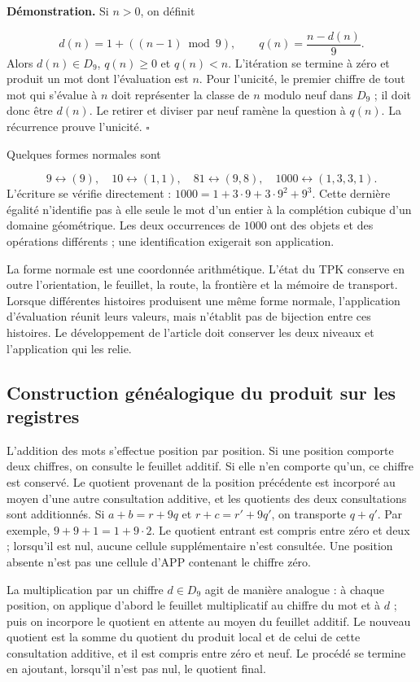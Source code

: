 \textbf{Démonstration.} Si $n>0$, on définit

\[
d(n)=1+((n-1)\bmod9),\qquad q(n)=\frac{n-d(n)}9.
\]
Alors $d(n)\in D_9$, $q(n)\ge0$ et $q(n)<n$. L’itération se termine à zéro et produit un mot dont l’évaluation est $n$. Pour l’unicité, le premier chiffre de tout mot qui s’évalue à $n$ doit représenter la classe de $n$ modulo neuf dans $D_9$ ; il doit donc être $d(n)$. Le retirer et diviser par neuf ramène la question à $q(n)$. La récurrence prouve l’unicité. \hfill\(\square\)

Quelques formes normales sont

\[
9\leftrightarrow(9),\quad
10\leftrightarrow(1,1),\quad
81\leftrightarrow(9,8),\quad
1000\leftrightarrow(1,3,3,1).
\]
L'écriture se vérifie directement : $1000=1+3\cdot9+3\cdot9^2+9^3$. Cette dernière égalité n'identifie pas à elle seule le mot d'un entier à la complétion cubique d'un domaine géométrique. Les deux occurrences de $1000$ ont des objets et des opérations différents ; une identification exigerait son application.

La forme normale est une coordonnée arithmétique. L'état du TPK conserve en outre l'orientation, le feuillet, la route, la frontière et la mémoire de transport. Lorsque différentes histoires produisent une même forme normale, l'application d'évaluation réunit leurs valeurs, mais n'établit pas de bijection entre ces histoires. Le développement de l'article doit conserver les deux niveaux et l'application qui les relie.

\subsection{Construction généalogique du produit sur les registres}
L'addition des mots s'effectue position par position. Si une position comporte deux chiffres, on consulte le feuillet additif. Si elle n'en comporte qu'un, ce chiffre est conservé. Le quotient provenant de la position précédente est incorporé au moyen d'une autre consultation additive, et les quotients des deux consultations sont additionnés. Si \(a+b=r+9q\) et \(r+c=r'+9q'\), on transporte \(q+q'\). Par exemple, \(9+9+1=1+9\cdot2\). Le quotient entrant est compris entre zéro et deux ; lorsqu'il est nul, aucune cellule supplémentaire n'est consultée. Une position absente n'est pas une cellule d'APP contenant le chiffre zéro.

La multiplication par un chiffre $d\in D_9$ agit de manière analogue : à chaque position, on applique d’abord le feuillet multiplicatif au chiffre du mot et à $d$ ; puis on incorpore le quotient en attente au moyen du feuillet additif. Le nouveau quotient est la somme du quotient du produit local et de celui de cette consultation additive, et il est compris entre zéro et neuf. Le procédé se termine en ajoutant, lorsqu’il n’est pas nul, le quotient final.

